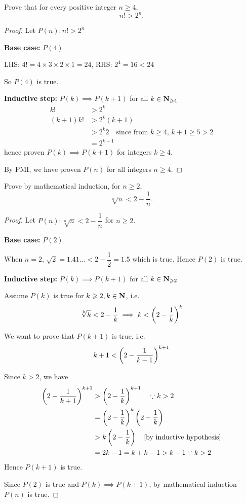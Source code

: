 \begin{prbm}
Prove that for every positive integer $n\ge4$,
\[ n!>2^n. \]
\end{prbm}

\begin{proof}
Let $P(n):n!>2^n$

\textbf{Base case:} $P(4)$

LHS: $4!=4\times3\times2\times1=24$, RHS: $2^4=16<24$

So $P(4)$ is true.

\textbf{Inductive step:} $P(k) \implies P(k+1)$ for all $k\in\mathbf N_{\geqslant4}$
\begin{align*}
k! &> 2^k \\
(k+1)k! &> 2^k(k+1) \\
&> 2^k2 \quad \text{since from $k\ge4$, $k+1\ge5>2$} \\
&= 2^{k+1}
\end{align*}
hence proven $P(k) \implies P(k+1)$ for integers $k\ge4$.

By PMI, we have proven $P(n)$ for all integers $n\ge4$.
\end{proof}

\begin{prbm}
Prove by mathematical induction, for $n\ge2$,
\[ \sqrt[n]{n}<2-\frac{1}{n}. \]
\end{prbm}

\begin{proof}
Let $P(n):\sqrt[n]{n}<2 - \dfrac{1}{n}$ for $n \ge 2$.

\textbf{Base case:} $P(2)$

When $n=2$, $\sqrt{2}=1.41\dots<2-\dfrac{1}{2}=1.5$ which is true. Hence $P(2)$ is true.

\textbf{Inductive step:} $P(k)\implies P(k+1)$ for all $k\in\mathbf N_{\geqslant2}$

Assume $P(k)$ is true for $k \geqslant 2, k \in \mathbf N$, i.e.
\[ \sqrt[k]{k}<2 - \dfrac{1}{k} \implies k<\left(2-\frac{1}{k}\right)^k \]

We want to prove that $P(k+1)$ is true, i.e.
\[ k+1<\left(2-\frac{1}{k+1}\right)^{k+1} \]

Since $k>2$, we have 
\begin{align*}
\left(2-\frac{1}{k+1}\right)^{k+1}
&> \left(2-\frac{1}{k}\right)^{k+1} \quad \because k>2 \\
&= \left(2-\frac{1}{k}\right)^k\left(2-\frac{1}{k}\right) \\
&> k\left(2-\frac{1}{k}\right) \quad \text{[by inductive hypothesis]} \\
&= 2k-1=k+k-1 > k-1 \because k>2
\end{align*}
Hence $P(k+1)$ is true.

Since $P(2)$ is true and $P(k)\implies P(k+1)$, by mathematical induction $P(n)$ is true.
\end{proof}

